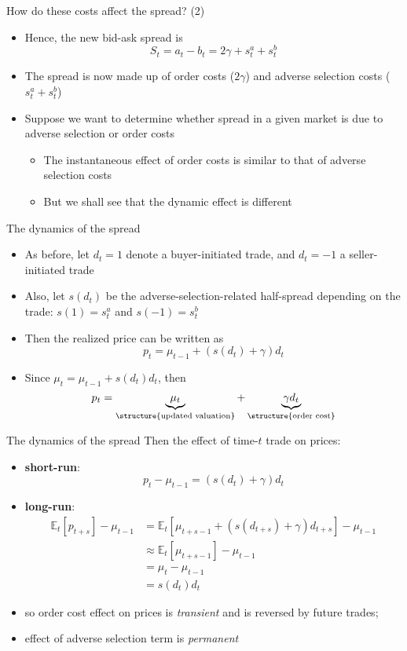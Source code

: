 \documentclass[english,10pt
,aspectratio=169
]{beamer}
\begin{document}
\begin{frame}{How do these costs affect the spread? (2)}
	\begin{itemize}
		\item  Hence, the new bid-ask spread is 
		\[
		S_{t} = a_{t} - b_{t} = 2\gamma +s^{a}_{t}  + s^{b}_{t}
		\]
		\item The spread is now made up of order costs ($2\gamma$) and adverse selection costs ($s^{a}_{t}  + s^{b}_{t}$)
		\item Suppose we want to determine whether spread in a given market is due to adverse selection or order costs
		\begin{itemize}
			\item The instantaneous effect of order costs is similar to that of adverse selection costs
			\item But we shall see that the dynamic effect is different
		\end{itemize}
	\end{itemize}
\end{frame}


\begin{frame}{The dynamics of the spread}
	\begin{itemize}
		\item As before, let $d_{t}=1$ denote a buyer-initiated trade, and $d_{t} = -1$ a seller-initiated trade
		\item Also, let $s(d_{t})$ be the adverse-selection-related half-spread depending on the trade: $s(1)=s^{a}_{t}$ and $s(-1)=s^{b}_{t}$
		\item Then the realized price can be written as
		\[
		p_{t} = \mu_{t-1} + (s(d_{t}) + \gamma) d_{t}
		\]
		\item Since $\mu_{t} = \mu_{t-1} + s(d_{t}) d_{t}$, then
		\[
		p_{t}  = \underbrace{\mu_{t}}_{\structure{\text{updated valuation}}} + \underbrace{\gamma d_{t}}_{\structure{\text{order cost}}}
		\]
	\end{itemize}
\end{frame}


\begin{frame}{The dynamics of the spread}
	Then the effect of time-$t$ trade on prices:
	\begin{itemize}
		\item \textbf{short-run}: $$p_t - \mu_{t-1} = (s(d_{t}) + \gamma) d_{t}$$
		\item \textbf{long-run}:
		\begin{align*}
			\mathbb{E}_t [p_{t+s}] - \mu_{t-1} &= \mathbb{E}_t [\mu_{t+s-1} + (s(d_{t+s}) + \gamma) d_{t+s}] - \mu_{t-1}
			\\
			&\approx \mathbb{E}_t [\mu_{t+s-1}] - \mu_{t-1}
			\\
			&= \mu_t - \mu_{t-1}
			\\
			&= s(d_t) d_t
		\end{align*}
		\item so order cost effect on prices is \emph{transient} and is reversed by future trades;
		\item effect of adverse selection term is \emph{permanent}
	\end{itemize}
\end{frame}
\end{document}
